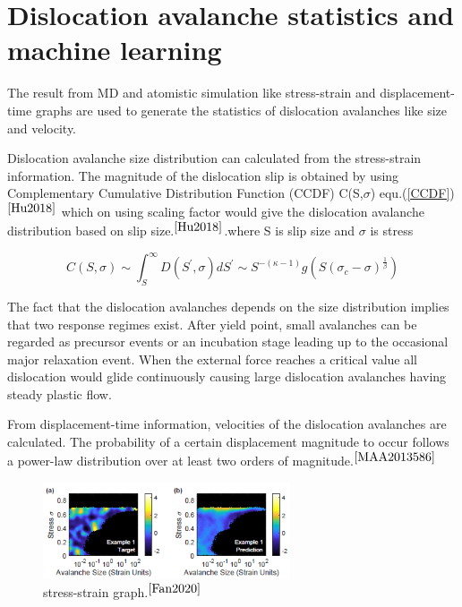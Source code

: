 \section{Dislocation avalanche statistics and machine learning}
The result from MD and atomistic simulation like stress-strain and displacement-time graphs are used to generate the statistics of dislocation avalanches like size and velocity.

Dislocation avalanche size distribution can calculated from the stress-strain information. The magnitude of the dislocation slip is obtained by using Complementary Cumulative Distribution
Function (CCDF) C(S,$\sigma$) equ.(\ref{CCDF})$^{\cite{Hu2018}}$ which on using scaling factor would give the dislocation avalanche distribution based on slip size.$^{\cite{Hu2018}}$.where S is slip size and $\sigma$ is stress

\begin{equation}\label{CCDF}
C(S, \sigma) \sim \int_{S}^{\infty} D\left(S^{\prime}, \sigma\right) d S^{\prime} \sim S^{-(\kappa-1)} g\left(S\left(\sigma_{c}-\sigma\right)^{\frac{1}{\beta}}\right)
\end{equation}

The fact that the dislocation avalanches depends on the size distribution implies that two response regimes exist. After yield point, small avalanches can be regarded as precursor events or an incubation stage
leading up to the occasional major relaxation event. When the external force reaches a critical value all dislocation would glide continuously causing large dislocation avalanches having steady plastic flow. 

From displacement-time information, velocities of the dislocation avalanches are calculated. The probability of a certain displacement magnitude to occur follows a power-law distribution over at least two orders of magnitude.$^{\cite{MAA2013586}}$


\begin{figure}
\centering
\includegraphics[width=0.65\textwidth]{section_4_1.png}
\caption{\label{fig:Simulation graph}stress-strain graph.$^{\cite{Fan2020}}$}
\end{figure}

